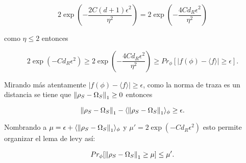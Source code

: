 \begin{equation}
 2 \exp(-\frac{2C(d+1)\epsilon^2}{\eta^2})= 2 \exp(-\frac{4Cd_{R}\epsilon^2}{\eta^2})
\end{equation}

como $\eta \le 2$ entonces

\begin{equation} \label{desigualdad}
2\exp(-Cd_{R}\epsilon^2) \ge 2 \exp(-\frac{4Cd_{R}\epsilon^2}{\eta^2}) \ge Pr_{\phi}[|f(\phi)- \langle f \rangle| \ge \epsilon ].
\end{equation}

Mirando más atentamente  $|f(\phi)- \langle f \rangle| \ge \epsilon $, como la norma de traza es un distancia se tiene que  $\norm{\rho_{S} -\Omega_{S}}_{1} \ge 0$ entonces


\begin{equation}
\norm{\rho_{S} -\Omega_{S}}_{1}- \langle \norm{\rho_{S} -\Omega_{S}}_{1} \rangle_{\phi} \ge \epsilon.
\end{equation}

Nombrando a $\mu = \epsilon + \langle \norm{\rho_{S} -\Omega_{S}}_{1} \rangle_{\phi} $ y $\mu'=2 \exp(-Cd_{R}\epsilon^2)$ esto permite organizar el lema de levy así:

\begin{equation} \label{eq.3}
Pr_{\phi}[\norm{\rho_{S} -\Omega_{S}}_{1} \ge \mu] \le \mu'.
\end{equation}

